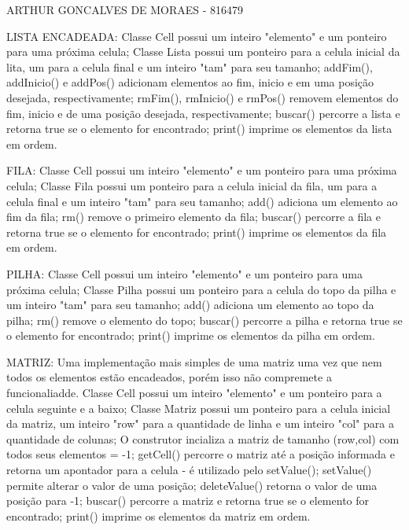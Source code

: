 ARTHUR GONCALVES DE MORAES - 816479

LISTA ENCADEADA:
Classe Cell possui um inteiro "elemento" e um ponteiro para uma próxima celula;
Classe Lista possui um ponteiro para a celula inicial da lita, um para a celula final e um inteiro "tam" para seu tamanho;
addFim(), addInicio() e addPos() adicionam elementos ao fim, inicio e em uma posição desejada, respectivamente;
rmFim(), rmInicio() e rmPos() removem elementos do fim, inicio e de uma posição desejada, respectivamente;
buscar() percorre a lista e retorna true se o elemento for encontrado;
print() imprime os elementos da lista em ordem.

FILA:
Classe Cell possui um inteiro "elemento" e um ponteiro para uma próxima celula;
Classe Fila possui um ponteiro para a celula inicial da fila, um para a celula final e um inteiro "tam" para seu tamanho;
add() adiciona um elemento ao fim da fila;
rm() remove o primeiro elemento da fila;
buscar() percorre a fila e retorna true se o elemento for encontrado; 
print() imprime os elementos da fila em ordem.

PILHA:
Classe Cell possui um inteiro "elemento" e um ponteiro para uma próxima celula;
Classe Pilha possui um ponteiro para a celula do topo da pilha e um inteiro "tam" para seu tamanho;
add() adiciona um elemento ao topo da pilha;
rm() remove o elemento do topo;
buscar() percorre a pilha e retorna true se o elemento for encontrado; 
print() imprime os elementos da pilha em ordem.

MATRIZ:
Uma implementação mais simples de uma matriz uma vez que nem todos os elementos estão encadeados, porém isso não compremete a funcionaliadde.
Classe Cell possui um inteiro "elemento" e um ponteiro para a celula seguinte e a baixo;
Classe Matriz possui um ponteiro para a celula inicial da matriz, um inteiro "row" para a quantidade de linha e um inteiro "col" para a quantidade de colunas;
O construtor incializa a matriz de tamanho (row,col) com todos seus elementos = -1;
getCell() percorre o matriz até a posição informada e retorna um apontador para a celula - é utilizado pelo setValue();
setValue() permite alterar o valor de uma posição;
deleteValue() retorna o valor de uma posição para -1;
buscar() percorre a matriz e retorna true se o elemento for encontrado; 
print() imprime os elementos da matriz em ordem.
